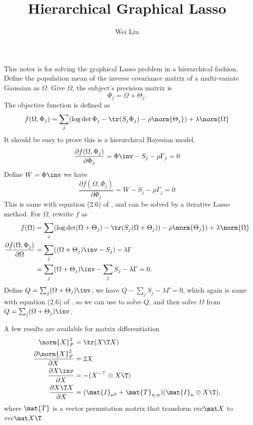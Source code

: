 \documentclass[12pt]{article}
\begin{document}
\title{Hierarchical Graphical Lasso}
\author{Wei Liu}
\maketitle

This notes is for solving the graphical Lasso problem in a hierarchical fashion. Define the population mean of the inverse covariance matrix of a multi-variate Gaussian as $\Omega$. Give $\Omega$, the subject's precision matrix is \[\Phi_j = \Omega + \Theta_j.\] The objective function is defined as
\[
f(\Omega, \Phi_j) = \sum_j(\log \det \Phi_j - \tr(S_j \Phi_j) - \rho\norm{\Theta_j}) + \lambda \norm{\Omega}
\]
It should be easy to prove this is a hierarchical Bayesian model. 
\[
\frac{\partial f(\Omega, \Phi_j)}{\partial \Phi_j} = \Phi\inv - S_j - \rho\Gamma_j = 0
\]
Define $W = \Phi\inv$ we have
\[
\frac{\partial f(\Omega, \Phi_j)}{\partial \Phi_j} = W - S_j - \rho\Gamma_j = 0
\]
This is same with equation (2.6) of \cite{friedman2008sparse}, and can be solved by a iterative Lasso method. For $\Omega$, rewrite $f$ as
\begin{align*}
f(\Omega) &= \sum_j(\log\det(\Omega + \Theta_j) - \tr(S_j(\Omega + \Theta_j)) - \rho\norm{\Theta_j}) + \lambda \norm{\Omega} \\
\frac{\partial f(\Omega, \Phi_j)}{\partial \Omega} &= \sum_j((\Omega+\Theta_j)\inv - S_j) - \lambda\Gamma \\
&=\sum_j(\Omega+\Theta_j)\inv -\sum_j S_j - \lambda\Gamma = 0.
\end{align*}
Define $Q = \sum_j (\Omega + \Theta_j)\inv$, we have $Q - \sum_j S_j - \lambda \Gamma = 0$, which again is same with equation (2.6) of \cite{friedman2008sparse}. so we can use \cite{friedman2008sparse} to solve $Q$, and then solve $\Omega$ from $Q = \sum_j (\Omega + \Theta_j)\inv$.

A few results are available for matrix differentiation
\begin{align*}
\norm{X}_F^2 &= \tr(X\T X) \\
\frac{\partial  \norm{X}_F^2}{\partial X} &= 2X \\
\frac{\partial X\inv}{\partial X} &= -(X^{-\top} \otimes X\T)\\
\frac{\partial X\T X}{\partial X} &= (\mat{I}_{n^2} + \mat{T}_{n,n})(\mat{I}_n\otimes X\T),
\end{align*}
where $\mat{T}$ is a vector permutation matrix that transform $vec \mat X$ to $vec \mat X\T$.


\end{document}
